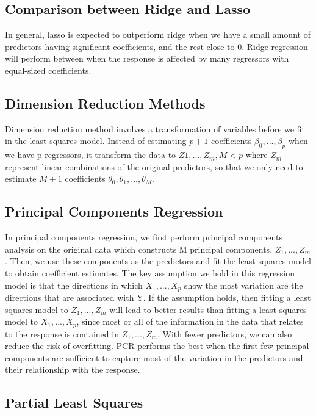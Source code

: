 \documentclass{article}
\begin{document}
\subsection{Comparison between Ridge and Lasso}

In general, lasso is expected to outperform ridge when we have a small amount of predictors having significant coefficients, and the rest close to 0. Ridge regression will perform between when the response is affected by many regressors with equal-sized coefficients. 


\subsection{Dimension Reduction Methods}

Dimension reduction method involves a transformation of variables before we fit in the least squares model. Instead of estimating $p + 1$ coefficients $\beta_0, ..., \beta_p$ when we have p regressors, it transform the data to $Z1, ..., Z_m, M < p$ where $Z_m$ represent linear combinations of the original predictors, so that we only need to estimate $M + 1$ coefficients $\theta_0, \theta_1, ..., \theta_M$. 

\subsection{Principal Components Regression}

In principal components regression, we first perform principal components analysis on the original data which constructs M principal components, $Z_1, ..., Z_m$. Then, we use these components as the predictors and fit the least squares model to obtain coefficient estimates. The key assumption we hold in this regression model is that the directions in which $X_1, ..., X_p$ show the most variation are the directions that are associated with Y. If the assumption holds, then fitting a least squares model to $Z_1, ..., Z_m$ will lead to better results than fitting a least squares model to $X_1, ..., X_p$, since most or all of the information in the data that relates to the response is contained in $Z_1, ..., Z_m$. With fewer predictors, we can also reduce the risk of overfitting. PCR performs the best when the first few principal components are sufficient to capture most of the variation in the predictors and their relationship with the response.

\subsection{Partial Least Squares}
\end{document}
